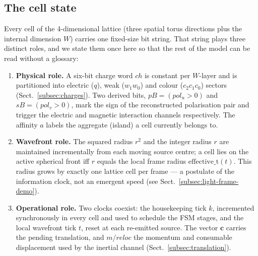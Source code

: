 
\subsection{The cell state}
\label{subsec:cell-state-demo}

Every cell of the 4-dimensional lattice (three spatial torus directions plus
the internal dimension $W$) carries one fixed-size bit string.  That string
plays three distinct roles, and we state them once here so that the rest of
the model can be read without a glossary:

\begin{enumerate}
\item \textbf{Physical role.}  A six-bit charge word $ch$ is constant per
      $W$-layer and is partitioned into electric ($q$), weak ($w_1w_0$) and
      colour ($c_2c_1c_0$) sectors (Sect.~\ref{subsec:charges}).  Two derived
      bits, $pB=(pol_u>0)$ and $sB=(pol_v>0)$, mark the sign of the
      reconstructed polarisation pair and trigger the electric and magnetic
      interaction channels respectively.  The affinity $a$ labels the
      aggregate (island) a cell currently belongs to.
\item \textbf{Wavefront role.}  The squared radius $r^2$ and the integer
      radius $r$ are maintained incrementally from each moving source centre;
      a cell lies on the active spherical front iff $r$ equals the local
      frame radius $\mathrm{effective\_t}(t)$.  This radius grows by exactly
      one lattice cell per frame --- a postulate of the information clock,
      not an emergent speed (see Sect.~\ref{subsec:light-frame-demo}).
\item \textbf{Operational role.}  Two clocks coexist: the housekeeping tick
      $k$, incremented synchronously in every cell and used to schedule the
      FSM stages, and the local wavefront tick $t$, reset at each re-emitted
      source.  The vector $\mathbf{c}$ carries the pending translation, and
      $m$/$reloc$ the momentum and consumable displacement used by the
      inertial channel (Sect.~\ref{subsec:translation}).
\end{enumerate}

